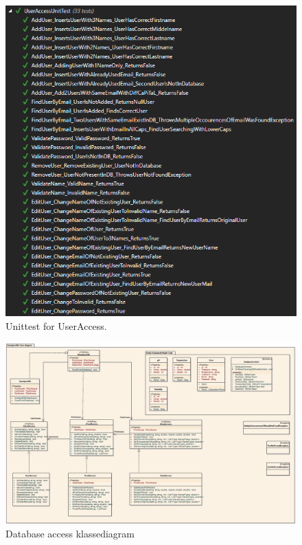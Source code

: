 \begin{figure}[h]
\centering
\includegraphics[width=0.7\linewidth]{figs/test/useraccessunittest_appendix.png}
\caption{Unittest for UserAccess.}
\label{fig:useraccessunittest_appendix}
\end{figure}

\begin{landscape}
	\begin{figure}[h]
		\centering
		\includegraphics[width=\linewidth]{figs/implementering/databaseFullClass.PNG}
		\caption{Database access klassediagram}
		\label{fig:databaseFullClass}
	\end{figure}
\end{landscape}